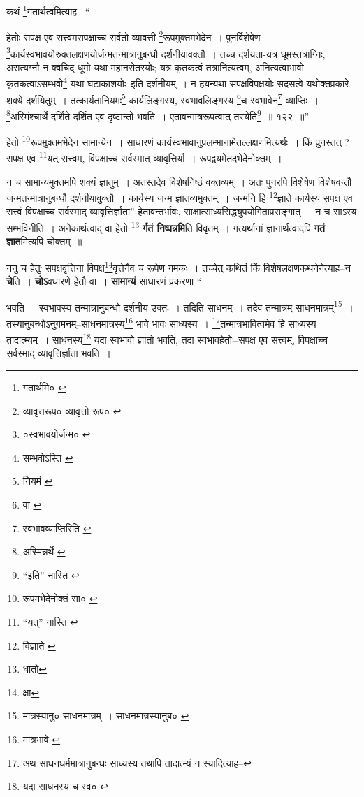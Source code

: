 \documentclass[article,12pt,a4paper]{memoir}
\begin{document}
	कथं \footnote{गतार्थमि० \cite{dp-edE}}\-गतार्थत्वमित्याह-- “
	  
	हेतोः सपक्ष एव सत्त्वमसपक्षाच्च सर्वतो व्यावत्ती \footnote{व्यावृत्तरूप० \cite{dp-msB} \cite{dp-edP} व्यावृत्तो रूप० \cite{dp-edH}}\-रूपमुक्तमभेदेन । पुनर्विशेषेण \footnote{०स्वभावयोर्जन्म० \cite{dp-msB} \cite{dp-msD} \cite{dp-edP} \cite{dp-edH} \cite{dp-edE} \cite{dp-edN}}\-कार्यस्वभावयोरुक्तलक्षणयोर्जन्मतन्मात्रानुबन्धौ दर्शनीयावक्तौ । तच्च दर्शयता-यत्र धूमस्तत्राग्निः, असत्यग्नौ न क्वचिद् धूमो यथा महानसेतरयोः; यत्र कृतकत्वं तत्रानित्यत्वम्, अनित्यत्वाभावो कृतकत्वाऽसम्भवो\footnote{सम्भवोऽस्ति \cite{dp-msC}} यथा घटाकाशयोः--इति दर्शनीयम् । न हयन्यथा सपक्षविपक्षयोः सदसत्वे यथोक्तप्रकारे शक्ये दर्शयितुम् । तत्कार्यतानियमः\footnote{नियमं \cite{dp-msC}} कार्यलिङ्गस्य, स्वभावलिङ्गस्य \footnote{वा \cite{dp-msC}}\-च स्वभावेन\footnote{स्वभावव्याप्तिरिति \cite{dp-msC}} व्याप्तिः । \footnote{अस्मिन्नर्थे \cite{dp-msC}}\-अस्मिंश्चार्थे दर्शिते दर्शित एव दृष्टान्तो भवति । एतावन्मात्ररूपत्वात् तस्येति\footnote{“इति” नास्ति \cite{dp-msC}} ॥ १२२ ॥” 
	  
	हेतो \footnote{रूपमभेदेनोक्तं सा० \cite{dp-msA} \cite{dp-msD} \cite{dp-edP} \cite{dp-edH} \cite{dp-edE}}\-रूपमुक्तमभेदेन सामान्येन । साधारणं कार्यस्वभावानुपलम्भानामेतल्लक्षणमित्यर्थः । किं पुनस्तत् ? सपक्ष एव \footnote{“यत्” नास्ति \cite{dp-msB} \cite{dp-msC} \cite{dp-msD}}\-यत् सत्त्वम्, विपक्षाच्च सर्वस्मात् व्यावृत्तिर्या । रूपद्वयमेतदभेदेनोक्तम् । 
	  
	न च सामान्यमुक्तमपि शक्यं ज्ञातुम् । अतस्तदेव विशेषनिष्ठं वक्तव्यम् । अतः पुनरपि विशेषेण विशेषवन्तौ जन्मतन्मात्रानुबन्धौ दर्शनीयावुक्तौ । कार्यस्य जन्म ज्ञातव्यमुक्तम् । जन्मनि हि \footnote{विज्ञाते \cite{dp-msA} \cite{dp-edP} \cite{dp-edH} \cite{dp-edE}}\-ज्ञाते कार्यस्य सपक्ष एव सत्त्वं विपक्षाच्च सर्वस्माद् व्यावृत्तिर्ज्ञाता” हेतावन्तर्भावः, साक्षात्साध्यसिद्ध्युपयोगिताप्रसङ्गात् । न च साऽस्य सम्भविनीति । अनेकार्थत्वाद् वा हेतो \footnote{धातो} \textbf{र्गतं निष्पन्नमि}ति विवृतम् । गत्यर्थानां ज्ञानार्थत्वादपि \textbf{गतं ज्ञात}मित्यपि चोक्तम् ॥
	\pend
      

	  \pstart ननु च हेतुः सपक्षवृत्तिना विपक्ष\footnote{क्षा}\-वृत्तेनैव च रूपेण गमकः । तच्चेत् कथितं किं विशेषलक्षणकथनेनेत्याह--\textbf{न चे}ति । \textbf{चोऽ}वधारणे हेतौ वा । \textbf{सामान्यं} साधारणं प्रकरणा  \leavevmode{} “
	  
	भवति । स्वभावस्य तन्मात्रानुबन्धो दर्शनीय उक्तः । तदिति साधनम् । तदेव तन्मात्रम् साधनमात्रम्\footnote{मात्रस्यानु० \cite{dp-msC} \cite{dp-msD} साधनमात्रम् । साधनमात्रस्यानुब० \cite{dp-msB} \cite{dp-edN}} । तस्यानुबन्धोऽनुगमनम्--साधनमात्रस्य\footnote{मात्रभावे \cite{dp-msA} \cite{dp-msB} \cite{dp-msD} \cite{dp-edP} \cite{dp-edH} \cite{dp-edE} \cite{dp-edN}} भावे भावः साध्यस्य । \footnote{अथ साधनधर्ममात्रानुबन्धः साध्यस्य तथापि तादात्म्यं न स्यादित्याह--\cite{dp-msD-n}}\-तन्मात्रभावित्वमेव हि साध्यस्य तादात्म्यम् । साधनस्य\footnote{यदा साधनस्य च स्व० \cite{dp-msC}} यदा स्वभावो ज्ञातो भवति, तदा स्वभावहेतोः--सपक्ष एव सत्त्वम्, विपक्षाच्च सर्वस्माद् व्यावृत्तिर्ज्ञाता भवति । 
	  
\end{document}
